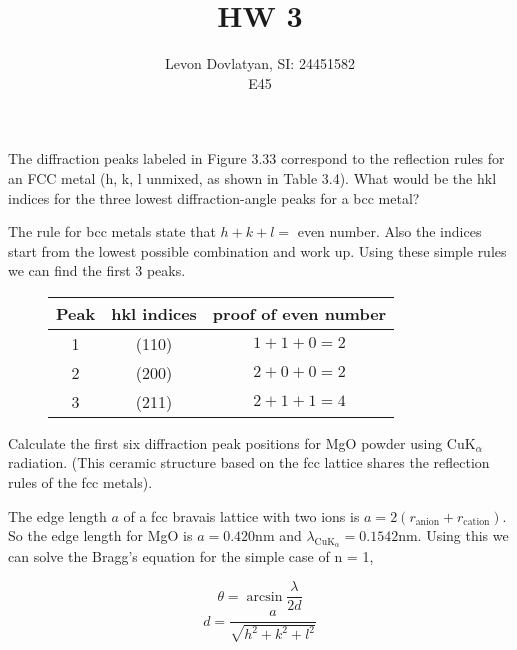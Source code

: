 \documentclass[12pt]{article}
\newenvironment{problem}[2][Problem]{\begin{trivlist}
\item[\hskip \labelsep {\bfseries #1}\hskip \labelsep {\bfseries #2.}]}{\end{trivlist}}
\begin{document}
\providecommand{\e}[1]{\ensuremath{\times 10^{#1}}}
 
\title{HW 3}%
\author{Levon Dovlatyan, SI: 24451582\\ %
E45} %
 
\maketitle
 
\begin{problem}{3.70}
The diffraction peaks labeled in Figure 3.33 correspond to the reflection rules for an FCC metal (h, k, l unmixed, as shown in Table 3.4). What would be the hkl indices for the three lowest diffraction-angle peaks for a bcc metal?
\end{problem}
 
The rule for bcc metals state that $h + k + l =$ even number. Also the indices start from the lowest possible combination and work up. Using these simple rules we can find the first 3 peaks.

\begin{figure}[H]
\centering
\begin{tabular}{c | c | c}
Peak & hkl indices & proof of even number \\ \hline
1 & (110) & $1+1+0=2$ \\ \hline
2 & (200) & $2+0+0=2$ \\ \hline
3 & (211) & $2+1+1=4$
\end{tabular}
\end{figure}

\begin{problem}{3.80}
Calculate the first six diffraction peak positions for MgO powder using Cu$\text{K}_{\alpha}$ radiation.  (This ceramic structure based on the fcc lattice shares the reflection rules of the fcc metals).
\end{problem}

The edge length $a$ of a fcc bravais lattice with two ions is $a = 2(r_{\text{anion}} + r_{\text{cation}})$. So the edge length for MgO is $a = 0.420$nm and $\lambda_{\text{CuK}_{\alpha}} = 0.1542$nm. Using this we can solve the Bragg's equation for the simple case of n = 1,

\begin{equation}
\theta = \arcsin{\frac{\lambda}{2d}}
\end{equation}
\begin{equation}
d = \frac{a}{\sqrt{h^2 + k^2 + l^2}}
\end{equation}
\end{document}
